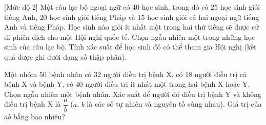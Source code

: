 \begin{bt}%
[Mức độ 2]%
	Một câu lạc bộ ngoại ngữ có $40$ học sinh, trong đó có $25$ học sinh giỏi tiếng Anh, $20$ học sinh giỏi tiếng Pháp và $15$ học sinh giỏi cả hai ngoại ngữ tiếng Anh và tiếng Pháp. Học sinh nào giỏi ít nhất một trong hai thứ tiếng sẽ được cử đi phiên dịch cho một Hội nghị quốc tế. Chọn ngẫu nhiên một trong những học sinh của câu lạc bộ. Tính xác suất để học sinh đó có thể tham gia Hội nghị (kết quả được ghi dưới dạng số thập phân).
\end{bt}

\begin{bt}%
	Một nhóm $50$ bệnh nhân có $32$ người điều trị bệnh X, có $18$ người điều trị cả bệnh X và bệnh Y, có $40$ người điều trị ít nhất một trong hai bệnh X hoặc Y. Chọn ngẫu nhiên một bệnh nhân. Xác suất để người đó điều trị bệnh Y và không điều trị bệnh X là $\dfrac{a}{b}$ ($a$, $b$ là các số tự nhiên và nguyên tố cùng nhau). Giá trị của $ab$ bằng bao nhiêu?
	
\end{bt}

